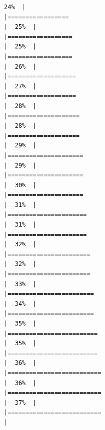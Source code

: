 \documentclass[
  english,
  man,a4paper,mask,floatsintext]{apa6}
\begin{document}
\begin{verbatim}
24%  |                                                                              |=================                                                     |  25%  |                                                                              |==================                                                    |  25%  |                                                                              |==================                                                    |  26%  |                                                                              |===================                                                   |  27%  |                                                                              |===================                                                   |  28%  |                                                                              |====================                                                  |  28%  |                                                                              |====================                                                  |  29%  |                                                                              |=====================                                                 |  29%  |                                                                              |=====================                                                 |  30%  |                                                                              |=====================                                                 |  31%  |                                                                              |======================                                                |  31%  |                                                                              |======================                                                |  32%  |                                                                              |=======================                                               |  32%  |                                                                              |=======================                                               |  33%  |                                                                              |========================                                              |  34%  |                                                                              |========================                                              |  35%  |                                                                              |=========================                                             |  35%  |                                                                              |=========================                                             |  36%  |                                                                              |==========================                                            |  36%  |                                                                              |==========================                                            |  37%  |                                                                              |==========================                                            |  
\end{verbatim}
\end{document}
